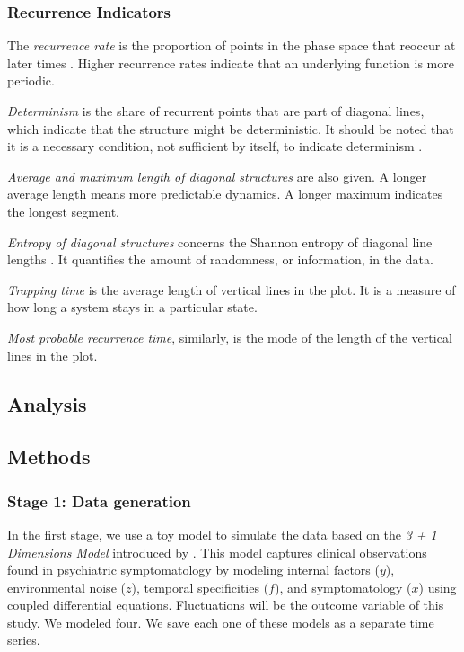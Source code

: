 \documentclass[utf8]{FrontiersinVancouver}
\begin{document}
\subsubsection{Recurrence Indicators}

The \textit{recurrence rate} is the proportion of points in the phase space that reoccur at later times \citep{webber2005recurrence}. Higher recurrence rates indicate that an underlying function is more periodic. 

\textit{Determinism} is the share of recurrent points that are part of diagonal lines, which indicate that the structure might be deterministic. It should be noted that it is a necessary condition, not sufficient by itself, to indicate determinism \citep{marwanHowAvoidPotential2011}.

\textit{Average and maximum length of diagonal structures} are also given. A longer average length means more predictable dynamics. A longer maximum indicates the longest segment.

\textit{Entropy of diagonal structures} concerns the Shannon entropy of diagonal line lengths \citep{kraemerRecurrenceThresholdSelection2018}. It quantifies the amount of randomness, or information, in the data.

\textit{Trapping time} is the average length of vertical lines in the plot. It is a measure of how long a system stays in a particular state.

\textit{Most probable recurrence time}, similarly, is the mode of the length of the vertical lines in the plot. 

\subsection{Analysis}

\subsection{Methods}

\subsubsection{Stage 1: Data generation}

In the first stage, we use a toy model to simulate the data based on the \textit{3 + 1 Dimensions Model} introduced by \citep{gauldDynamicalSystemsComputational2023}. This model captures clinical observations found in psychiatric symptomatology by modeling internal factors ($y$), environmental noise ($z$), temporal specificities ($f$), and symptomatology ($x$) using coupled differential equations. Fluctuations  will be the outcome variable of this study. We modeled four. We save each one of these models as a separate time series. 
\end{document}
